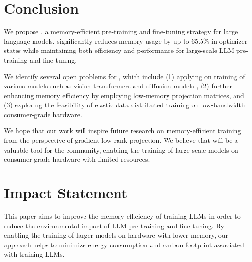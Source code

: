 




\section{Conclusion}

We propose \lowrank{}, a memory-efficient pre-training and fine-tuning strategy for large language models.
\lowrank{} significantly reduces memory usage by up to 65.5\% in optimizer states while maintaining both efficiency and performance for large-scale LLM pre-training and fine-tuning.

We identify several open problems for \lowrank{}, which include (1) applying \lowrank{} on training of various models such as vision transformers \citep{dosovitskiy2021an} and diffusion models \citep{ho2020denoising}, (2) further enhancing memory efficiency by employing low-memory projection matrices, and (3) exploring the feasibility of elastic data distributed training on low-bandwidth consumer-grade hardware.

We hope that our work will inspire future research on memory-efficient training from the perspective of gradient low-rank projection. 
We believe that \lowrank{} will be a valuable tool for the community, enabling the training of large-scale models on consumer-grade hardware with limited resources.

\section*{Impact Statement}

This paper aims to improve the memory efficiency of training LLMs in order to reduce the environmental impact of LLM pre-training and fine-tuning. By enabling the training of larger models on hardware with lower memory, our approach helps to minimize energy consumption and carbon footprint associated with training LLMs.